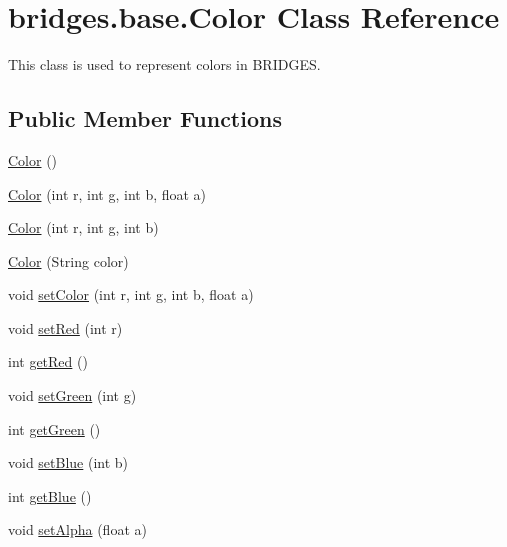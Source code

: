 \hypertarget{classbridges_1_1base_1_1_color}{}\section{bridges.\+base.\+Color Class Reference}
\label{classbridges_1_1base_1_1_color}


This class is used to represent colors in B\+R\+I\+D\+G\+ES.  


\subsection*{Public Member Functions}
\begin{DoxyCompactItemize}
\item 
\mbox{\hyperlink{classbridges_1_1base_1_1_color_ab6d71ac2ee1430fb2db2fbe34e692de8}{Color}} ()
\item 
\mbox{\hyperlink{classbridges_1_1base_1_1_color_a15f56590ca3c9cc161c7bfa47060ad21}{Color}} (int r, int g, int b, float a)
\item 
\mbox{\hyperlink{classbridges_1_1base_1_1_color_a5fab564fa4eec8bece64f847ebd42948}{Color}} (int r, int g, int b)
\item 
\mbox{\hyperlink{classbridges_1_1base_1_1_color_a5cb17fdf8eddf44fc0763ceb7d4d833b}{Color}} (String color)
\item 
void \mbox{\hyperlink{classbridges_1_1base_1_1_color_a5559b1c7eb4c3901526b1012029b528f}{set\+Color}} (int r, int g, int b, float a)
\item 
void \mbox{\hyperlink{classbridges_1_1base_1_1_color_a1d78967703924b709e76def5b2b3ee9a}{set\+Red}} (int r)
\item 
int \mbox{\hyperlink{classbridges_1_1base_1_1_color_af1a30dc925b35d6bfe609f8838651025}{get\+Red}} ()
\item 
void \mbox{\hyperlink{classbridges_1_1base_1_1_color_a415a28133ade4e216c02ecdfc8a32a1d}{set\+Green}} (int g)
\item 
int \mbox{\hyperlink{classbridges_1_1base_1_1_color_a8f3fdd23cf785704faa2e3701e25978f}{get\+Green}} ()
\item 
void \mbox{\hyperlink{classbridges_1_1base_1_1_color_a0e04156b1573cf8002c4d9cb69825657}{set\+Blue}} (int b)
\item 
int \mbox{\hyperlink{classbridges_1_1base_1_1_color_ad4b82e1eb9ff59857d2868edd8d4ce65}{get\+Blue}} ()
\item 
void \mbox{\hyperlink{classbridges_1_1base_1_1_color_afab07ce64efa1fa5797795670b0effb6}{set\+Alpha}} (float a)

\end{DoxyCompactItemize}
